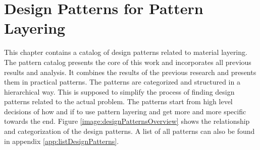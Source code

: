 \chapter{Design Patterns for Pattern Layering}\label{cha:patterns}

This chapter contains a catalog of design patterns related to material layering. The pattern catalog presents the core of this work and incorporates all previous results and analysis. It combines the results of the previous research and presents them in practical patterns. The patterns are categorized and structured in a hierarchical way. This is supposed to simplify the process of finding design patterns related to the actual problem. The patterns start from high level decisions of how and if to use pattern layering and get more and more specific towards the end. Figure \ref{image:designPatternsOverview} shows the relationship and categorization of the design patterns. A list of all patterns can also be found in appendix \ref{app:listDesignPatterns}. 

